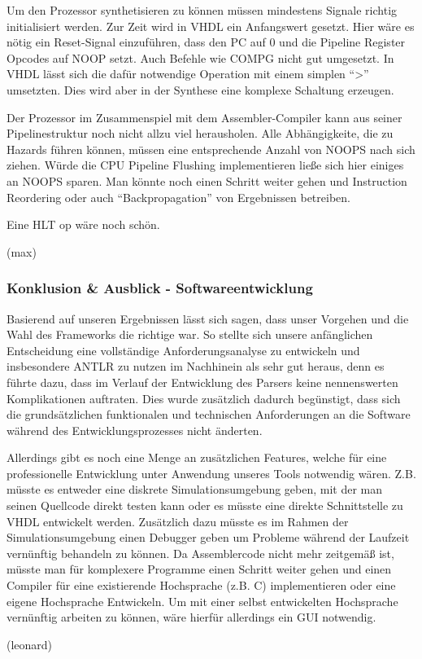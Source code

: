 \documentclass[paper=a4,fontsize=12pt,twocolumn]{scrreprt}
\begin{document}
Um den Prozessor synthetisieren zu können müssen mindestens Signale richtig initialisiert werden.
Zur Zeit wird in VHDL ein Anfangswert gesetzt.
Hier wäre es nötig ein Reset-Signal einzuführen, dass den PC auf 0 und die Pipeline Register Opcodes auf NOOP setzt.
Auch Befehle wie COMPG nicht gut umgesetzt.
In VHDL lässt sich die dafür notwendige Operation mit einem simplen \enquote{>} umsetzten.
Dies wird aber in der Synthese eine komplexe Schaltung erzeugen.

Der Prozessor im Zusammenspiel mit dem Assembler-Compiler kann aus seiner Pipelinestruktur noch nicht allzu viel herausholen.
Alle Abhängigkeite, die zu Hazards führen können, müssen eine entsprechende Anzahl von NOOPS nach sich ziehen.
Würde die CPU Pipeline Flushing implementieren ließe sich hier einiges an NOOPS sparen.
Man könnte noch einen Schritt weiter gehen und Instruction Reordering oder auch \enquote{Backpropagation} von Ergebnissen betreiben.

Eine HLT op wäre noch schön.

(max)

\subsubsection{Konklusion \& Ausblick - Softwareentwicklung}
Basierend auf unseren Ergebnissen lässt sich sagen, dass unser Vorgehen und die Wahl des Frameworks die richtige war. 
So stellte sich unsere anfänglichen Entscheidung eine vollständige Anforderungsanalyse zu entwickeln und insbesondere ANTLR zu nutzen im Nachhinein als sehr gut heraus, denn es führte dazu, dass im Verlauf der Entwicklung des Parsers keine nennenswerten Komplikationen auftraten. Dies wurde zusätzlich dadurch begünstigt, dass sich die grundsätzlichen funktionalen und technischen Anforderungen an die Software während des Entwicklungsprozesses nicht änderten.

Allerdings gibt es noch eine Menge an zusätzlichen Features, welche für eine professionelle Entwicklung unter Anwendung unseres Tools notwendig wären. Z.B. müsste es entweder eine diskrete Simulationsumgebung geben, mit der man seinen Quellcode direkt testen kann oder es müsste eine direkte Schnittstelle zu VHDL %
entwickelt werden. Zusätzlich dazu müsste es im Rahmen der Simulationsumgebung einen Debugger geben um Probleme während der Laufzeit vernünftig behandeln zu können.
Da Assemblercode nicht mehr zeitgemäß ist, müsste man für komplexere Programme einen Schritt weiter gehen und einen Compiler für eine existierende Hochsprache (z.B. C) implementieren oder eine eigene Hochsprache Entwickeln. Um mit einer selbst entwickelten Hochsprache vernünftig arbeiten zu können, wäre hierfür allerdings ein GUI notwendig. %

(leonard)

\end{document}
